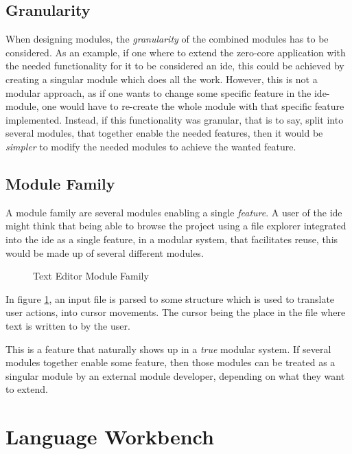 \subsection{Granularity}

When designing modules, the \textit{granularity} of the combined modules has to
be considered. As an example, if one where to extend the zero-core application
with the needed functionality for it to be considered an \gls{ide}, this could be
achieved by creating a singular module which does all the work. However, this
is not a modular approach, as if one wants to change some specific feature in
the \gls{ide}-module, one would have to re-create the whole module with that
specific feature implemented. Instead, if this functionality was granular,
that is to say, split into several modules, that together enable the needed
features, then it would be \textit{simpler} to modify the needed modules to
achieve the wanted feature.


\subsection{Module Family}

A module family are several modules enabling a single
\textit{feature}. A user of the \gls{ide} might think that being able to browse
the project using a file explorer integrated into the \gls{ide} as a single
feature, in a modular system, that facilitates reuse, this would be made up of
several different modules.

\begin{figure}
  \centering
  
  \caption{Text Editor Module Family}
  \label{fig:textEditorSimple}
\end{figure}

In figure \ref{fig:textEditorSimple}, an input file is parsed to some structure
which is used to translate user actions, into cursor movements. The cursor being
the place in the file where text is written to by the user.

This is a feature that naturally shows up in a \textit{true} modular system. If
several modules together enable some feature, then those modules can be treated
as a singular module by an external module developer, depending on what they
want to extend.


\section{Language Workbench}

